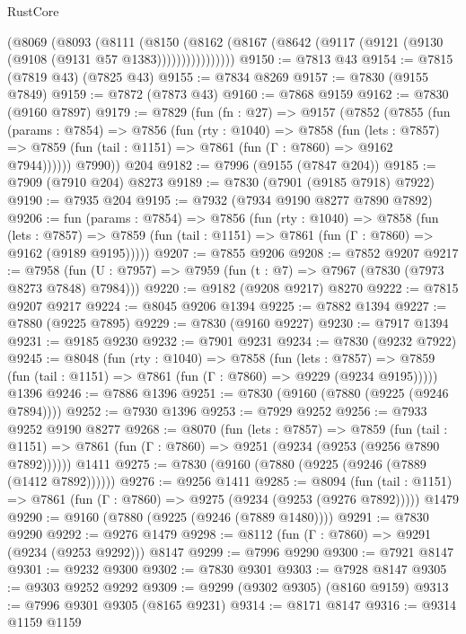 \begin{lexlean}{RustCore}
\begin{coremodule}
            (@8069
              (@8093
                (@8111
                  (@8150
                    (@8162
                      (@8167 (@8642 (@9117 (@9121 (@9130 (@9108 (@9131 @57 @1383))))))))))))))))
@9150 := @7813 @43
@9154 := @7815 (@7819 @43) (@7825 @43)
@9155 := @7834 @8269
@9157 := @7830 (@9155 @7849)
@9159 := @7872 (@7873 @43)
@9160 := @7868 @9159
@9162 := @7830 (@9160 @7897)
@9179 := @7829
    (fun (fn : @27) =>
    @9157
      (@7852
        (@7855
          (fun (params : @7854) =>
          @7856
            (fun (rty : @1040) =>
            @7858
              (fun (lets : @7857) =>
              @7859 (fun (tail : @1151) => @7861 (fun (Γ : @7860) => @9162 @7944))))))
        @7990))
    @204
@9182 := @7996 (@9155 (@7847 @204))
@9185 := @7909 (@7910 @204) @8273
@9189 := @7830 (@7901 (@9185 @7918) @7922)
@9190 := @7935 @204
@9195 := @7932 (@7934 @9190 @8277 @7890 @7892)
@9206 := fun (params : @7854) =>
  @7856
    (fun (rty : @1040) =>
    @7858
      (fun (lets : @7857) =>
      @7859 (fun (tail : @1151) => @7861 (fun (Γ : @7860) => @9162 (@9189 @9195)))))
@9207 := @7855 @9206
@9208 := @7852 @9207
@9217 := @7958 (fun (U : @7957) => @7959 (fun (t : @7) => @7967 (@7830 (@7973 @8273 @7848) @7984)))
@9220 := @9182 (@9208 @9217) @8270
@9222 := @7815 @9207 @9217
@9224 := @8045 @9206 @1394
@9225 := @7882 @1394
@9227 := @7880 (@9225 @7895)
@9229 := @7830 (@9160 @9227)
@9230 := @7917 @1394
@9231 := @9185 @9230
@9232 := @7901 @9231
@9234 := @7830 (@9232 @7922)
@9245 := @8048
    (fun (rty : @1040) =>
    @7858
      (fun (lets : @7857) =>
      @7859 (fun (tail : @1151) => @7861 (fun (Γ : @7860) => @9229 (@9234 @9195)))))
    @1396
@9246 := @7886 @1396
@9251 := @7830 (@9160 (@7880 (@9225 (@9246 @7894))))
@9252 := @7930 @1396
@9253 := @7929 @9252
@9256 := @7933 @9252 @9190 @8277
@9268 := @8070
    (fun (lets : @7857) =>
    @7859
      (fun (tail : @1151) => @7861 (fun (Γ : @7860) => @9251 (@9234 (@9253 (@9256 @7890 @7892))))))
    @1411
@9275 := @7830 (@9160 (@7880 (@9225 (@9246 (@7889 (@1412 @7892))))))
@9276 := @9256 @1411
@9285 := @8094
    (fun (tail : @1151) => @7861 (fun (Γ : @7860) => @9275 (@9234 (@9253 (@9276 @7892)))))
    @1479
@9290 := @9160 (@7880 (@9225 (@9246 (@7889 @1480))))
@9291 := @7830 @9290
@9292 := @9276 @1479
@9298 := @8112 (fun (Γ : @7860) => @9291 (@9234 (@9253 @9292))) @8147
@9299 := @7996 @9290
@9300 := @7921 @8147
@9301 := @9232 @9300
@9302 := @7830 @9301
@9303 := @7928 @8147
@9305 := @9303 @9252 @9292
@9309 := @9299 (@9302 @9305) (@8160 @9159)
@9313 := @7996 @9301 @9305 (@8165 @9231)
@9314 := @8171 @8147
@9316 := @9314 @1159 @1159

\end{coremodule}
\end{lexlean}
